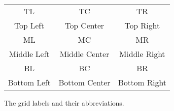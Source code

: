 \begin{figure}
  \begin{center}
  \begin{tabular}{ c |c |c }
    \large{TL} & \large{TC} & \large{TR}\\
    Top Left & Top Center & Top Right \\
    \hline
    \large{ML} & \large {MC} & \large {MR }\\
    Middle Left & Middle Center & Middle Right \\
    \hline
    \large{BL} & \large {BC} & \large {BR }\\ 
    Bottom Left & Bottom Center & Bottom Right
    \label{fig:gridLabels}
  \end{tabular}
  \caption{The grid labels and their abbreviations.}
\end{center}
\end{figure}

 